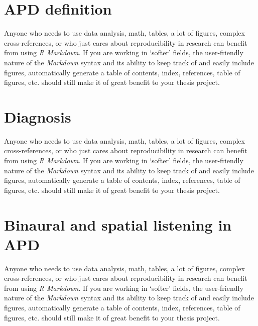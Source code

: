 \documentclass[a4paper, twoside]{templates/ociamthesis}
\begin{document}
\hypertarget{apd-definition}{%
\section*{APD definition}\label{apd-definition}}

Anyone who needs to use data analysis, math, tables, a lot of figures, complex cross-references, or who just cares about reproducibility in research can benefit from using \emph{R Markdown}.
If you are working in `softer' fields, the user-friendly nature of the \emph{Markdown} syntax and its ability to keep track of and easily include figures, automatically generate a table of contents, index, references, table of figures, etc. should still make it of great benefit to your thesis project.

\hypertarget{diagnosis}{%
\section*{Diagnosis}\label{diagnosis}}

Anyone who needs to use data analysis, math, tables, a lot of figures, complex cross-references, or who just cares about reproducibility in research can benefit from using \emph{R Markdown}.
If you are working in `softer' fields, the user-friendly nature of the \emph{Markdown} syntax and its ability to keep track of and easily include figures, automatically generate a table of contents, index, references, table of figures, etc. should still make it of great benefit to your thesis project.

\hypertarget{binaural-and-spatial-listening-in-apd}{%
\section*{Binaural and spatial listening in APD}\label{binaural-and-spatial-listening-in-apd}}

Anyone who needs to use data analysis, math, tables, a lot of figures, complex cross-references, or who just cares about reproducibility in research can benefit from using \emph{R Markdown}.
If you are working in `softer' fields, the user-friendly nature of the \emph{Markdown} syntax and its ability to keep track of and easily include figures, automatically generate a table of contents, index, references, table of figures, etc. should still make it of great benefit to your thesis project.
\end{document}
